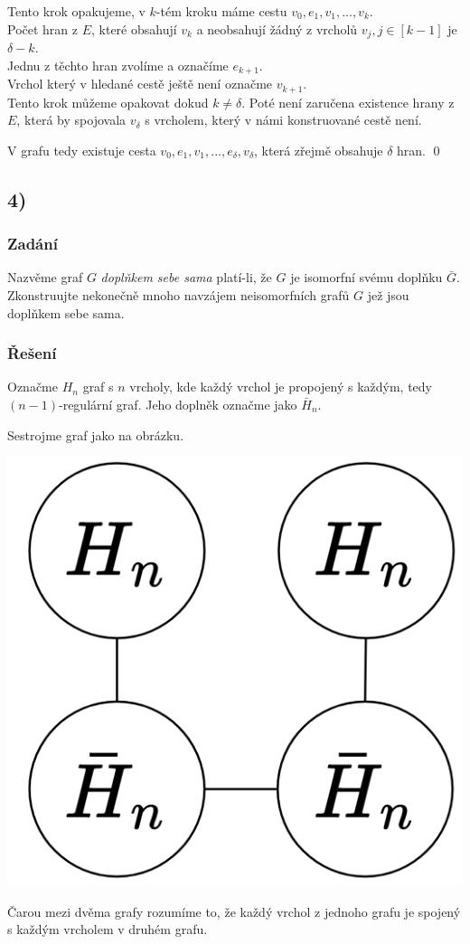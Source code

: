 \documentclass[../main.tex]{subfiles}
\begin{document}
Tento krok opakujeme, v $k$-tém kroku máme cestu $v_0, e_1, v_1, ..., v_k$. \\
Počet hran z $E$, které obsahují $v_k$ a neobsahují žádný z vrcholů $v_j, j\in[k-1]$ je $\delta-k$.\\
Jednu z těchto hran zvolíme a označíme $e_{k+1}$.\\
Vrchol který v hledané cestě ještě není označme $v_{k+1}$.\\


Tento krok můžeme opakovat dokud $k \neq \delta$. Poté není zaručena existence hrany z $E$, 
která by spojovala $v_\delta$ s vrcholem, který v námi konstruované cestě není.

V grafu tedy existuje cesta $v_0, e_1, v_1, ...,e_\delta , v_\delta$, která zřejmě obsahuje $\delta$ hran.
\qed


\subsection{4)}
\subsubsection*{Zadání}
Nazvěme graf $G$ \textit{doplňkem sebe sama} platí-li, že $G$ je isomorfní svému doplňku $\bar{G}$. 
Zkonstruujte nekonečně mnoho navzájem neisomorfních grafů $G$ jež jsou doplňkem sebe sama.
\subsubsection*{Řešení}

Označme $H_n$ graf s $n$ vrcholy, kde každý vrchol je propojený s každým, tedy $(n-1)$-regulární graf. 
Jeho doplněk označme jako $\bar{H}_n$.

Sestrojme graf jako na obrázku.

\begin{center}
    \centering
    \includegraphics*[width=0.3\linewidth]{images/hw1-4a.png}
\end{center}

Čarou mezi dvěma grafy rozumíme to, že každý vrchol z jednoho grafu je spojený s každým vrcholem v druhém grafu. 
\end{document}
